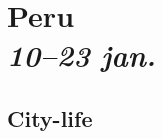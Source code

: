 \section*{Peru \\ {\footnotesize \textit{10--23 jan.}}}
\begin{figure}[!h]
	\centering
\noindent{}
	\caption*{}
\label{fig:coverphoto}
\end{figure}

\begin{figure}[!h]
	\centering
\noindent{}
	\caption*{}
\label{fig:coverphoto}
\end{figure}
\clearpage
\subsection*{City-life}



